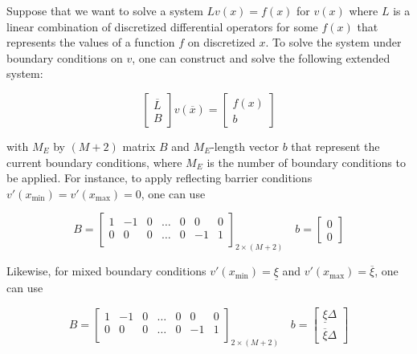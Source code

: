 \documentclass[11pt]{article}
\begin{document}
Suppose that we want to solve a system $L v({x}) = f(x) $ for $v(x)$ where $L$ is a linear combination of discretized differential operators for some $f(x)$ that represents the values of a function $f$ on discretized $x$. To solve the system under boundary conditions on $v$, one can construct and solve the following extended system:

\begin{equation}\label{eq:extended-system}
\begin{bmatrix}
\overline{L} \\
B
\end{bmatrix} 
v(\overline{x}) = 
\begin{bmatrix}
f(x) \\
b
\end{bmatrix} 
\end{equation}

with $M_E$ by $(M+2)$ matrix $B$ and $M_E$-length vector $b$ that represent the current boundary conditions, where $M_E$ is the number of boundary conditions to be applied. For instance, to apply reflecting barrier conditions $v'(x_{\min}) = v'(x_{\max}) = 0$, one can use

\begin{equation}\label{eq:reflecting-barrier-matrix}
B = \begin{bmatrix}
1 & -1 & 0 & \dots & 0 & 0 & 0 \\
0 & 0 & 0 & \dots & 0 & -1 & 1\\
\end{bmatrix}_{2 \times (M+2)} \quad 
b = \begin{bmatrix}
0 \\
0
\end{bmatrix}
\end{equation}

Likewise, for mixed boundary conditions $v'(x_{\min}) = \underline{\xi}$ and $v'(x_{\max}) = \overline{\xi}$, one can use

\begin{equation}\label{eq:mixed-boundary-matrix}
B = \begin{bmatrix}
1 & -1 & 0 & \dots & 0 & 0 & 0 \\
0 & 0 & 0 & \dots & 0 & -1 & 1\\
\end{bmatrix}_{2 \times (M+2)} \quad 
b = \begin{bmatrix}
 \underline{\xi} \Delta \\
\overline{\xi} \Delta
\end{bmatrix}
\end{equation}
\end{document}
